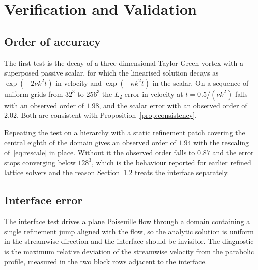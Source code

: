 \chapter{Verification and Validation}
\label{chap:validation}

\section{Order of accuracy}
\label{sec:val-order}

The first test is the decay of a three dimensional Taylor Green vortex with a
superposed passive scalar, for which the linearised solution decays as
$\exp(-2\nu k^{2} t)$ in velocity and $\exp(-\kappa k^{2} t)$ in the scalar. On
a sequence of uniform grids from $32^{3}$ to $256^{3}$ the $L_2$ error in
velocity at $t = 0.5 / (\nu k^{2})$ falls with an observed order of $1.98$, and
the scalar error with an observed order of $2.02$. Both are consistent with
Proposition~\ref{prop:consistency}.

Repeating the test on a hierarchy with a static refinement patch covering the
central eighth of the domain gives an observed order of $1.94$ with the
rescaling of~\eqref{eq:rescale} in place. Without it the observed order falls to
$0.87$ and the error stops converging below $128^{3}$, which is the behaviour
reported for earlier refined lattice solvers and the reason
Section~\ref{sec:val-interface} treats the interface separately.

\section{Interface error}
\label{sec:val-interface}

The interface test drives a plane Poiseuille flow through a domain containing a
single refinement jump aligned with the flow, so the analytic solution is
uniform in the streamwise direction and the interface should be invisible. The
diagnostic is the maximum relative deviation of the streamwise velocity from the
parabolic profile, measured in the two block rows adjacent to the interface.

